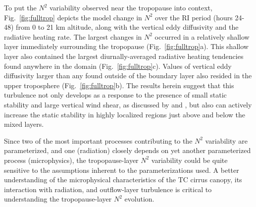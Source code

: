 To put the $N^2$ variability observed near the tropopause into context, Fig.~\ref{fig:fulltrop} depicts the model change in $N^2$ over the RI period (hours 24-48) from 0 to 21 km altitude, along with the vertical eddy diffusivity and the radiative heating rate.
The largest changes in $N^2$ occurred in a relatively shallow layer immediately surrounding the tropopause (Fig.~\ref{fig:fulltrop}a).
This shallow layer also contained the largest diurnally-averaged radiative heating tendencies found anywhere in the domain (Fig.~\ref{fig:fulltrop}c).
Values of vertical eddy diffusivity larger than any found outside of the boundary layer also resided in the upper troposphere (Fig.~\ref{fig:fulltrop}b).
The results herein suggest that this turbulence not only develops as a response to the presence of small static stability and large vertical wind shear, as discussed by \cite{Molinarietal2014} and \cite{DuranMolinari2016}, but also can actively increase the static stability in highly localized regions just above and below the mixed layers.

Since two of the most important processes contributing to the $N^2$ variability are parameterized, and one (radiation) closely depends on yet another parameterized process (microphysics), the tropopause-layer $N^2$ variability could be quite sensitive to the assumptions inherent to the parameterizations used.
A better understanding of the microphysical characteristics of the TC cirrus canopy, its interaction with radiation, and outflow-layer turbulence is critical to understanding the tropopause-layer $N^2$ evolution.



